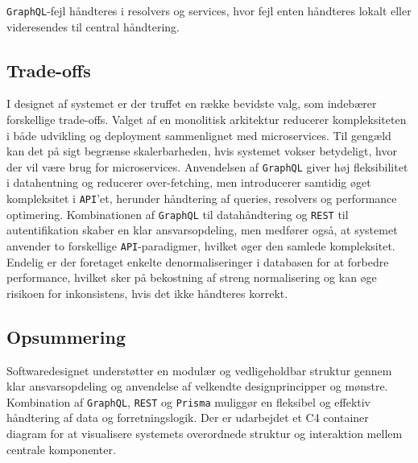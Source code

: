 \texttt{GraphQL}-fejl håndteres i resolvers og services, hvor fejl enten håndteres lokalt eller videresendes
til central håndtering.

\subsection{Trade-offs}
I designet af systemet er der truffet en række bevidste valg, som indebærer forskellige trade-offs.
Valget af en monolitisk arkitektur reducerer kompleksiteten i både udvikling og deployment sammenlignet
med microservices.
Til gengæld kan det på sigt begrænse skalerbarheden, hvis systemet vokser betydeligt, hvor der
vil være brug for microservices.
Anvendelsen af \texttt{GraphQL} giver høj fleksibilitet i datahentning og reducerer over-fetching,
men introducerer samtidig øget kompleksitet i \texttt{API}'et, herunder håndtering af queries,
resolvers og performance optimering.
Kombinationen af \texttt{GraphQL} til datahåndtering og \texttt{REST} til autentifikation skaber en klar
ansvarsopdeling, men medfører også, at systemet anvender to forskellige \texttt{API}-paradigmer, hvilket
øger den samlede kompleksitet.
Endelig er der foretaget enkelte denormaliseringer i databasen for at forbedre performance, hvilket
sker på bekostning af streng normalisering og kan øge risikoen for inkonsistens, hvis det
ikke håndteres korrekt.

\subsection{Opsummering}

Softwaredesignet understøtter en modulær og vedligeholdbar struktur gennem klar ansvarsopdeling
og anvendelse af velkendte designprincipper og mønstre.
Kombination af \texttt{GraphQL}, \texttt{REST} og \texttt{Prisma} muliggør en fleksibel og effektiv
håndtering af data og forretningslogik.
Der er udarbejdet et C4 container diagram for at visualisere systemets overordnede struktur og interaktion
mellem centrale komponenter.